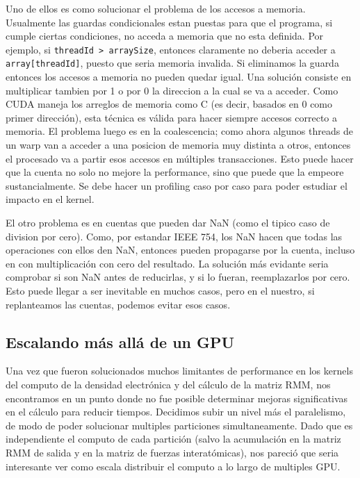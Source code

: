 Uno de ellos es como solucionar el problema de los accesos a memoria.
Usualmente las guardas condicionales estan puestas para que el programa, si cumple ciertas condiciones,
no acceda a memoria que no esta definida. Por ejemplo, si \texttt{threadId > arraySize}, entonces claramente
no deberia acceder a \texttt{array[threadId]}, puesto que seria memoria invalida. Si eliminamos la guarda
entonces los accesos a memoria no pueden quedar igual. Una soluci\'on consiste en multiplicar tambien
por 1 o por 0 la direccion a la cual se va a acceder. Como CUDA maneja los arreglos de memoria
como C (es decir, basados en 0 como primer direcci\'on), esta t\'ecnica es v\'alida para hacer
siempre accesos correcto a memoria. El problema luego es en la coalescencia; como ahora algunos
threads de un warp van a acceder a una posicion de memoria muy distinta a otros, entonces el procesado
va a partir esos accesos en m\'ultiples transacciones. Esto puede hacer que la cuenta no solo no mejore
la performance, sino que puede que la empeore sustancialmente. Se debe hacer un profiling caso
por caso para poder estudiar el impacto en el kernel.

El otro problema es en cuentas que pueden dar NaN (como el tipico caso de division por cero).
Como, por estandar IEEE 754, los NaN hacen que todas las operaciones con ellos den NaN,
entonces pueden propagarse por la cuenta, incluso en con multiplicaci\'on con cero del resultado.
La soluci\'on m\'as evidante seria comprobar si son NaN antes de reducirlas, y si lo fueran, reemplazarlos
por cero. Esto puede llegar a ser inevitable en muchos casos, pero en el nuestro, si replanteamos
las cuentas, podemos evitar esos casos.

\subsection{Escalando m\'as all\'a de un GPU}
Una vez que fueron solucionados muchos limitantes de performance en los kernels del computo
de la densidad electr\'onica y del c\'alculo de la matriz RMM, nos encontramos en un punto donde
no fue posible determinar mejoras significativas en el c\'alculo para reducir tiempos.
Decidimos subir un nivel m\'as el paralelismo, de modo de poder solucionar multiples particiones
simultaneamente. Dado que es independiente el computo de cada partici\'on (salvo la acumulaci\'on
en la matriz RMM de salida y en la matriz de fuerzas interat\'omicas), nos pareci\'o que seria
interesante ver como escala distribuir el computo a lo largo de multiples GPU.

